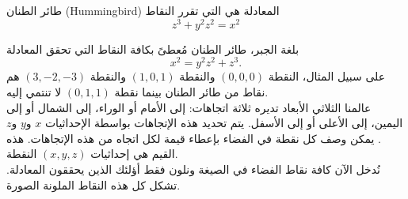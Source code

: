 \begin{surferPage}{طائر الطنان (Hummingbird)}
المعادلة هي التي تقرر النقاط\\
  
  \smallskip
\[z^3+ y^2	z^2	= x^2\]

\singlespacing
بلغة الجبر، طائر الطنان مُعطىً بكافة النقاط التي تحقق المعادلة
\smallskip
\[ x^2= y^2z^2+z^3.\]
\smallskip
على سبيل المثال، النقطة
 $(0,0,0)$
  والنقطة  
  $(1,0,1)$
   والنقطة
 $(3,-2,-3)$ 
    هم نقاط من طائر الطنان بينما نقطة
     $(0,1,1)$
      لا تنتمي إليه.\\
 \singlespacing
عالمنا الثلاثي الأبعاد تديره ثلاثة اتجاهات: إلى الأمام أو الوراء، إلى الشمال أو إلى اليمين، إلى الأعلى أو إلى الأسفل. يتم تحديد هذه الإتجاهات بواسطة الإحداثيات $x$ و$y$ و$z$. يمكن وصف كل نقطة في الفضاء بإعطاء قيمة لكل اتجاه من هذه الإتجاهات. هذه القيم هي إحداثيات
 $(x,y,z)$
  النقطة.\\
\singlespacing
نُدخل الآن كافة نقاط الفضاء في الصيغة ونلون فقط أؤلئك الذين يحققون المعادلة. تشكل كل هذه النقاط الملونة الصورة.
\end{surferPage}
